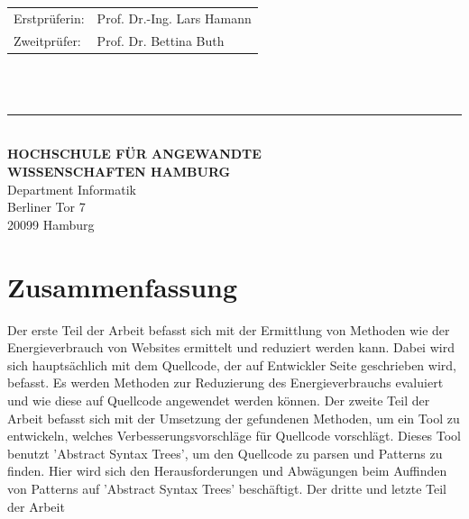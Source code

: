\begin{titlepage}
  \vspace{5cm}

  \hspace*{37mm}
  \begin{minipage}{0.5\linewidth}
    \begin{tabular}{@{}ll}
      Erstprüferin: & Prof. Dr.-Ing. Lars Hamann\\[-.3mm]
      Zweitprüfer: & Prof. Dr. Bettina Buth \\
    \end{tabular}\\

    \,\rule{9mm}{1mm}\\[1.5mm]

    \textbf{HOCHSCHULE FÜR ANGEWANDTE}\\
    \textbf{WISSENSCHAFTEN HAMBURG}\\
    Department Informatik\\
    Berliner Tor 7\\
    20099 Hamburg
  \end{minipage}
\end{titlepage}
\restoregeometry

\thispagestyle{empty}

\section*{Zusammenfassung}

Der erste Teil der Arbeit befasst sich mit der Ermittlung von Methoden wie 
der Energieverbrauch von Websites ermittelt und reduziert werden kann. 
Dabei wird sich hauptsächlich mit dem Quellcode, der auf Entwickler Seite geschrieben
wird, befasst. Es werden Methoden zur Reduzierung des Energieverbrauchs
evaluiert und wie diese auf Quellcode angewendet werden können.
Der zweite Teil der Arbeit befasst sich mit der Umsetzung der gefundenen Methoden,
um ein Tool zu entwickeln, welches Verbesserungsvorschläge für Quellcode vorschlägt.
Dieses Tool benutzt 'Abstract Syntax Trees', um den Quellcode zu parsen und Patterns
zu finden. Hier wird sich den Herausforderungen und Abwägungen beim Auffinden von Patterns
auf 'Abstract Syntax Trees' beschäftigt.
Der dritte und letzte Teil der Arbeit